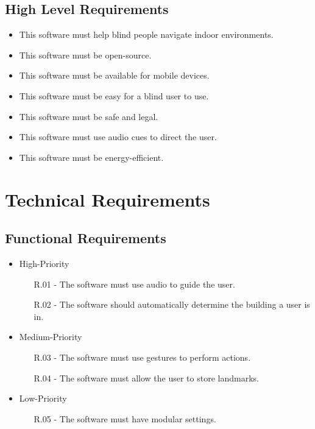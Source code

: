 \documentclass{scrreprt}
\begin{document}
	\section{High Level Requirements}
	\begin{itemize}
		\item This software must help blind people navigate indoor environments.
		
		\item This software must be open-source.
		
		\item This software must be available for mobile devices.
		
		\item This software must be easy for a blind user to use.
		
		\item This software must be safe and legal.
		
		\item This software must use audio cues to direct the user.
		
		\item This software must be energy-efficient.
	\end{itemize}

\chapter{Technical Requirements}

	\section{Functional Requirements}
	\begin{itemize}
		\item High-Priority
		\begin{itemize}
			\item[R.01 -] The software must use audio to guide the user.
			\item[R.02 -] The software should automatically determine the building a user is in.
		\end{itemize}
		
		\item Medium-Priority
		\begin{itemize}
			\item[R.03 -] The software must use gestures to perform actions.
			\item[R.04 -] The software must allow the user to store landmarks.
		\end{itemize}
		
		\item Low-Priority
		\begin{itemize}
			\item[R.05 -] The software must have modular settings.
		\end{itemize}
	\end{itemize}
\end{document}
